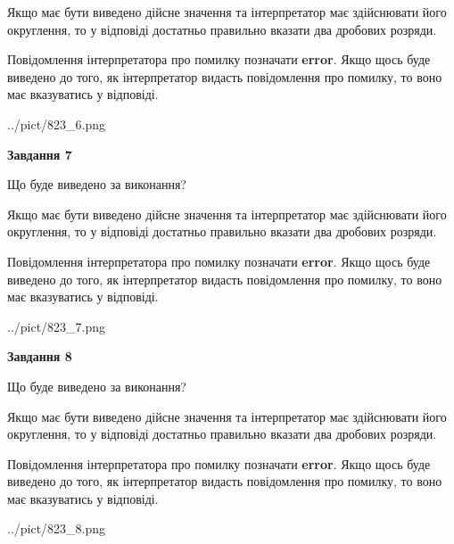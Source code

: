 \documentclass[12pt, ukrainian]{article}
\begin{document}
{\begin {Large}
Якщо має бути виведено дійсне значення та інтерпретатор має здійснювати його округлення, 
то у відповіді достатньо правильно вказати два дробових розряди.

Повідомлення інтерпретатора про помилку позначати \textbf{error}.
Якщо щось буде виведено до того, як інтерпретатор видасть повідомлення про помилку, 
то воно має вказуватись у відповіді. \par

\begin{center}
	{../pict/823_6.png}
\end{center}
\newpage

{\begin {center}\textbf{Завдання 7}\end {center}}\par
Що буде виведено за виконання? \par

Якщо має бути виведено дійсне значення та інтерпретатор має здійснювати його округлення, 
то у відповіді достатньо правильно вказати два дробових розряди.

Повідомлення інтерпретатора про помилку позначати \textbf{error}.
Якщо щось буде виведено до того, як інтерпретатор видасть повідомлення про помилку, 
то воно має вказуватись у відповіді. \par

\begin{center}
	{../pict/823_7.png}
\end{center}
\newpage

{\begin {center}\textbf{Завдання 8}\end {center}}\par
Що буде виведено за виконання? \par

Якщо має бути виведено дійсне значення та інтерпретатор має здійснювати його округлення, 
то у відповіді достатньо правильно вказати два дробових розряди.

Повідомлення інтерпретатора про помилку позначати \textbf{error}.
Якщо щось буде виведено до того, як інтерпретатор видасть повідомлення про помилку, 
то воно має вказуватись у відповіді. \par

\begin{center}
	{../pict/823_8.png}
\end{center}
\newpage


\end{Large}}
\end{document}
